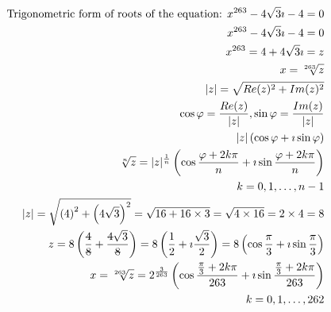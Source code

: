 \documentclass{article}
\newcommand{\stkout}[1]{\ifmmode\text{\sout{\ensuremath{#1}}}\else\sout{#1}\fi}
\begin{document}
    \begin{align*}
        \text{Trigonometric form of roots of the equation: } x ^ {263} - 4\sqrt3\imath -4 = 0\\
            x ^ {263} - 4\sqrt3\imath -4 = 0\\
            x ^ {263} = 4 + 4\sqrt3\imath = z\\
            x = \sqrt[263]{z}\\
            |z| = \sqrt{Re(z) ^ {2} + Im(z) ^ {2}}\\
            \cos\varphi = \frac{ Re(z) }{|z|}, \sin\varphi = \frac{Im(z)}{|z|}\\
            |z|\left(\cos\varphi + \imath\sin\varphi\right)\\
            \sqrt[n]{z}  = |z| ^ \frac{1}{n}\left(\cos{\frac{\varphi + 2k\pi}{n}} + \imath\sin{\frac{\varphi + 2k\pi}{n}}\right)\\
            k = 0, 1, \dots, n - 1\\
            |z| = \sqrt{\left(4\right)^2 + \left(4\sqrt3\right) ^ 2}
            = \sqrt{16 + 16 \times 3}
            = \sqrt{4 \times 16} = 2 \times 4 = 8\\
            z = 8\left(\frac{\stkout{4}}{\stkout{8}} + \frac{\stkout{4}\sqrt3}{\stkout{8}}\right)
            = 8\left(\frac{1}{2} + \imath\frac{\sqrt3}{2}\right)
            = 8\left(\cos\frac{\pi}{3} + \imath\sin\frac{\pi}{3}\right)\\
            x = \sqrt[263]{z} = 2 ^ {\frac{3}{263}}\left(\cos{\frac{\frac{\pi}{3} + 2k\pi}{263}} + \imath\sin{\frac{\frac{\pi}{3} + 2k\pi}{263}}\right)\\
            k = 0, 1, \dots, 262\\
    \end{align*}
\end{document}
